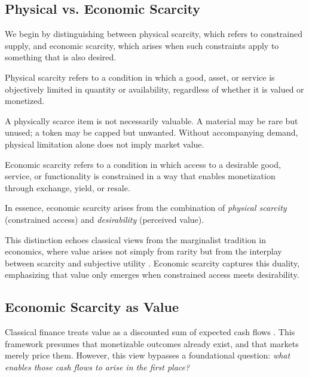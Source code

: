 \documentclass[12pt]{article}
\begin{document}
\subsection{Physical vs. Economic Scarcity}

We begin by distinguishing between physical scarcity, which refers to constrained supply, and economic scarcity, which arises when such constraints apply to something that is also desired.

\begin{tcolorbox}[title=\textbf{Definition (Physical Scarcity)}]
Physical scarcity refers to a condition in which a good, asset, or service is objectively limited in quantity or availability, regardless of whether it is valued or monetized.
\end{tcolorbox}

A physically scarce item is not necessarily valuable. A material may be rare but unused; a token may be capped but unwanted. Without accompanying demand, physical limitation alone does not imply market value.

\begin{tcolorbox}[title=\textbf{Definition (Economic Scarcity)}]
Economic scarcity refers to a condition in which access to a desirable good, service, or functionality is constrained in a way that enables monetization through exchange, yield, or resale.

In essence, economic scarcity arises from the combination of \textit{physical scarcity} (constrained access) and \textit{desirability} (perceived value).
\end{tcolorbox}


This distinction echoes classical views from the marginalist tradition in economics, where value arises not simply from rarity but from the interplay between scarcity and subjective utility \citep{menger1871principles, jevons1871political}. Economic scarcity captures this duality, emphasizing that value only emerges when constrained access meets desirability.
\subsection{Economic Scarcity as Value}

Classical finance treats value as a discounted sum of expected cash flows \citep{williams1938theory, brealey2022principles, damodaran2012investment}. This framework presumes that monetizable outcomes already exist, and that markets merely price them. However, this view bypasses a foundational question: \textit{what enables those cash flows to arise in the first place?}
\end{document}
